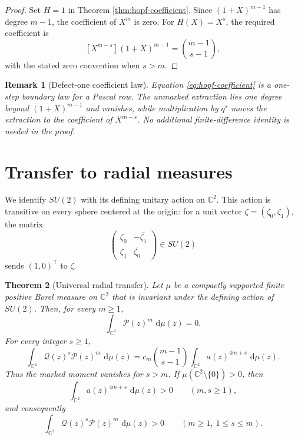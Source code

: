 \documentclass[11pt]{article}
\numberwithin{equation}{section}
\newtheorem{theorem}{Theorem}[section]
\newtheorem{remark}[theorem]{Remark}
\newcommand{\C}{\mathbb C}
\newcommand{\dd}{\,\mathrm d}
\begin{document}
\begin{proof}
Set $H=1$ in Theorem \ref{thm:hopf-coefficient}.  Since
$(1+X)^{m-1}$ has degree $m-1$, the coefficient of $X^m$ is zero.  For
$H(X)=X^s$, the required coefficient is
\[
 [X^{m-s}](1+X)^{m-1}=\binom{m-1}{s-1},
\]
with the stated zero convention when $s>m$.
\end{proof}

\begin{remark}[Defect-one coefficient law]\label{rem:defect-one}
Equation \eqref{eq:hopf-coefficient} is a one-step boundary law for a Pascal
row.  The unmarked extraction lies one degree beyond
$(1+X)^{m-1}$ and vanishes, while multiplication by $q^s$ moves the extraction
to the coefficient of $X^{m-s}$.  No additional finite-difference identity is
needed in the proof.
\end{remark}

\section{Transfer to radial measures}\label{sec:radial-transfer}

We identify $SU(2)$ with its defining unitary action on $\C^2$.  This action is
transitive on every sphere centered at the origin: for a unit vector
$\zeta=(\zeta_0,\zeta_1)$, the matrix
\[
 \begin{pmatrix}\zeta_0&-\overline{\zeta_1}\\
 \zeta_1&\overline{\zeta_0}\end{pmatrix}\in SU(2)
\]
sends $(1,0)^{\mathsf T}$ to $\zeta$.

\begin{theorem}[Universal radial transfer]\label{thm:radial-transfer}
Let $\mu$ be a compactly supported finite positive Borel measure on $\C^2$
that is invariant under the defining action of $SU(2)$.  Then, for every
$m\geq1$,
\begin{equation}\label{eq:radial-pure}
 \int_{\C^2}\mathscr P(z)^m\,\dd\mu(z)=0.
\end{equation}
For every integer $s\geq1$,
\begin{equation}\label{eq:radial-marked}
 \int_{\C^2}\mathscr Q(z)^s\mathscr P(z)^m\,\dd\mu(z)
 =c_m\binom{m-1}{s-1}
 \int_{\C^2}a(z)^{4m+s}\,\dd\mu(z).
\end{equation}
Thus the marked moment vanishes for $s>m$.  If
$\mu(\C^2\setminus\{0\})>0$, then
\[
 \int_{\C^2}a(z)^{4m+s}\,\dd\mu(z)>0
 \qquad(m,s\geq1),
\]
and consequently
\begin{equation}\label{eq:radial-positive}
 \int_{\C^2}\mathscr Q(z)^s\mathscr P(z)^m\,\dd\mu(z)>0
 \qquad(m\geq1,\ 1\leq s\leq m).
\end{equation}
\end{theorem}
\end{document}
